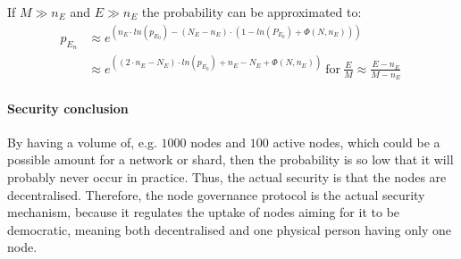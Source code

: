 If $M \gg n_E$ and $E \gg n_E$ the probability can be approximated to:
\begin{equation}
\begin{align*}
 p_{E_n} & \approx e^{(n_E \cdot ln(p_{E_0})-(N_E-n_E) \cdot (1-ln(P_{E_0})+\Phi(N,n_E)))} \\ 
         &\approx e^{((2 \cdot n_E - N_E) \cdot ln(p_{E_0}) + n_E - N_E + \Phi(N,n_E))} ~ 
 \text{for} ~ \frac{E}{M} \approx \frac{E-n_E}{M-n_E}
\
\end{align*}
\end{equation}

\paragraph{Security conclusion\\}
By having a volume of, e.g. $1000$ nodes and $100$ active nodes, which could be a possible amount for a network or shard, then the probability is so low that it will probably never occur in practice. Thus, the actual security is that the nodes are decentralised. Therefore, the node governance protocol is the actual security mechanism, because it regulates the uptake of nodes aiming for it to be democratic, meaning both decentralised and one physical person having only one node.  
